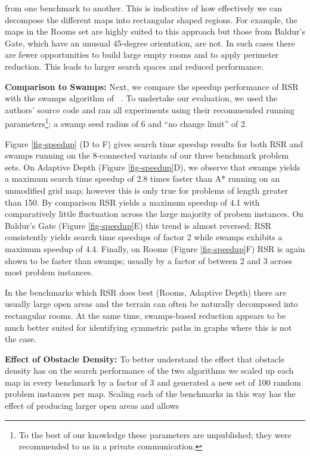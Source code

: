 from one benchmark to another. This is indicative of how effectively we can 
decompose the different maps into rectangular shaped regions.
For example, the maps in the Rooms set are highly suited to this approach but those
from Baldur's Gate, which have an unusual 45-degree orientation, are not.
In such cases there are fewer opportunities to build large empty rooms and to apply perimeter reduction.
This leads to larger search spaces and reduced performance. 
\par
\textbf{Comparison to Swamps:}
Next, we compare the speedup performance of RSR with the swamps algorithm
of \citeauthor{pochter10}~.
To undertake our evaluation, we used the authors' source code and ran all experiments 
using their recommended running parameters\footnote{To the best of our knowledge 
these parameters are unpublished; they were recommended to us in a private
communication.}:
 a swamp seed radius of 6 and ``no change limit'' of 2.
\par
Figure \ref{fig-speedup} (D to F) gives search time speedup results for both 
RSR and swamps running on the 8-connected variants of our three benchmark 
problem sets. 
On Adaptive Depth (Figure \ref{fig-speedup}D), we observe that 
swamps yields a maximum search time speedup of 2.8 times faster than 
 A* running on an unmodified grid map; however this is only true for problems of length greater than 150.
By comparison RSR yields a maximum speedup of 4.1 with comparatively little fluctuation across the
large majority of probem instances.
On Baldur's Gate (Figure \ref{fig-speedup}E) this trend is almost reversed; RSR consistently 
yields search time speedups of factor 2 while swamps exhibits a maximum speedup of 4.4.
Finally, on Rooms (Figure \ref{fig-speedup}F) RSR is again shown to be faster than swamps;
usually by a factor of between 2 and 3 across most problem instances.
\par
In the benchmarks which RSR does best (Rooms, Adaptive Depth) 
there are usually large open areas and the terrain can often be naturally decomposed into rectangular rooms.
At the same time, swamps-based reduction appears to be much better suited for identifying symmetric paths 
in graphs where this is not the case.
\par
\textbf{Effect of Obstacle Density:}
To better understand the effect that obstacle density has on the search performance of the two algorithms
we scaled up each map in every benchmark by a factor of 3 and generated a new
set of 100 random problem instances per map.
Scaling each of the benchmarks in this way has the effect of producing larger open areas and allows 
